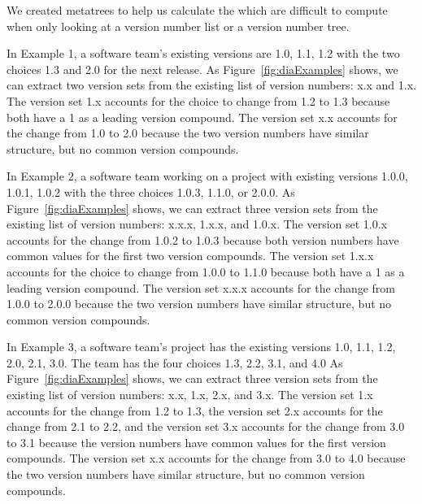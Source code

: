 \documentclass[conference]{IEEEtran}
\begin{document}

We  created metatrees to help us calculate the \numberchoices which are difficult to compute when only looking at a version number list or a version number tree.

In Example 1, a software team's existing versions are 1.0, 1.1, 1.2 with the two choices 1.3 and 2.0 for the next release. As Figure~\ref{fig:diaExamples} shows, we can extract two version sets from the existing list of version numbers: x.x and 1.x. The version set 1.x accounts for the choice to change from 1.2 to 1.3 because both have a 1 as a leading version compound. The version set x.x accounts for the change from 1.0 to 2.0 because the two version numbers have similar structure, but no common version compounds.



In Example 2, a software team working on a project with existing versions 1.0.0, 1.0.1, 1.0.2 with the three choices 1.0.3, 1.1.0, or 2.0.0. 
As Figure~\ref{fig:diaExamples} shows, we can extract three version sets from the existing list of version numbers: x.x.x, 1.x.x, and 1.0.x. 
The version set 1.0.x accounts for the change from 1.0.2 to 1.0.3 because both version numbers have common values for the first two version compounds. 
The version set 1.x.x accounts for the choice to change from 1.0.0 to 1.1.0 because both have a 1 as a leading version compound. 
The version set x.x.x accounts for the change from 1.0.0 to 2.0.0 because the two version numbers have similar structure, but no common version compounds.



In Example 3, a software team's project has the existing versions 1.0, 1.1, 1.2, 2.0, 2.1, 3.0. The team has the four choices 1.3, 2.2, 3.1, and 4.0 
As Figure~\ref{fig:diaExamples} shows, we can extract three version sets from the existing list of version numbers: x.x, 1.x, 2.x, and 3.x. 
The version set 1.x accounts for the change from 1.2 to 1.3, the version set 2.x accounts for the change from 2.1 to 2.2, and the version set 3.x accounts for the change from 3.0 to 3.1 because the version numbers have common values for the first version compounds. 
The version set x.x accounts for the change from 3.0 to 4.0 because the two version numbers have similar structure, but no common version compounds.
\end{document}
